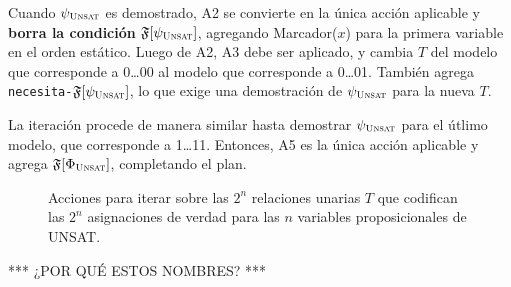 Cuando $\psi_{\textsc{Unsat}}$ es demostrado, A2 se convierte en la única acción
aplicable y \textbf{borra la condición} $\FT[\psi_\UNSAT]$, agregando
Marcador($x$) para la primera variable en el orden estático.
Luego de A2, A3 debe ser aplicado, y cambia $T$ del modelo que corresponde a
0\ldots00 al modelo que corresponde a 0\ldots01. También agrega
\texttt{necesita-}$\FT[\psi_\UNSAT]$, lo que exige una demostración de
$\psi_{\textsc{Unsat}}$ para la nueva $T$.

La iteración procede de manera similar hasta demostrar $\psi_{\textsc{Unsat}}$ para el
útlimo modelo, que corresponde a 1\ldots11. Entonces, A5 es la única acción
aplicable y agrega $\FT[\Phi_\UNSAT]$, completando el plan.

\begin{figure}[t]
\centering
\fbox{
  \resizebox{!}{1.5in}{
    \begin{minipage}{3.6in}
    \begin{tabbing}
    Pre: \= \kill
    [A1] \textsc{ComenzarPrueba}: \\[.2em]
    Pre: \> \texttt{necesita-}$\FT[\Phi_\UNSAT]$ \\
    Efe: \> para cada $x\in\text{Var}$: no-T($x$) \,, \\
         \> $\neg$\texttt{necesita-}$\FT[\Phi_\UNSAT]$ \,,\, \texttt{necesita-}$\FT[\psi_\UNSAT]$ \\[1em]
    [A2] \textsc{PrimeraIteración}($x$): \\[.2em]
    Pre: \> $\FT[\psi_\UNSAT]$ \,,\, VarPrimera-T($x$) \\
    Efe: \> $\neg$$\FT[\psi_\UNSAT]$ \,,\, Marcador-T($x$) \\[1em]
    [A3] \textsc{SiguienteSobreExcluidos}($x$): \\[.2em]
    Pre: \> Marcador-T($x$) \,,\, no-T($x$) \\
    Efe: \> $\neg$no-T($x$) \,,\, T($x$) \,,\, $\neg$Marcador-T($x$) \,,\, \texttt{necesita-}$\FT[\psi_\UNSAT]$ \\[1em]
    [A4] \textsc{SiguienteSobreIncluidos}($x,y$): \\[.2em]
    Pre: \> Marcador-T($x$) \,,\, T($x$) \,,\, VarSuc-T($x,y$) \\
    Efe: \> $\neg$T($x$) \,,\, no-T($x$) \,,\, $\neg$Marcador-T($x$) \,,\, Marcador-T($y$) \\[1em]
    [A5] \textsc{TerminarPrueba}($x$): \\[.2em]
    Pre: Marcador-T($x$) \,,\, T($x$) \,,\, VarÚlt-T($x$) \\
    Efe: $\neg$T($x$) \,,\, no-T($x$) \,,\, $\neg$Marcador-T($x$) \,,\, $\FT[\Phi_\UNSAT]$
    \end{tabbing}
    \end{minipage}
  }
}
\caption[Acciones para realizar la iteración del cuantificador universal de
segundo orden]{Acciones para iterar sobre las $2^n$ relaciones unarias $T$
  que codifican las $2^n$ asignaciones de verdad para las $n$ variables
proposicionales de UNSAT.}
\label{fig:unsat}
\end{figure}
*** ¿POR QUÉ ESTOS NOMBRES? ***

